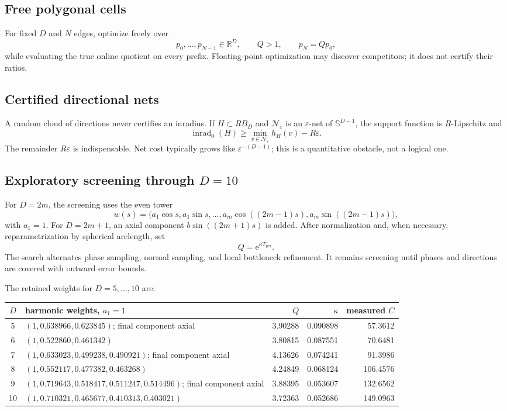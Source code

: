 \documentclass[10pt,a4paper]{article}
\newcommand{\R}{\mathbb{R}}
\newcommand{\Sph}{\mathbb{S}}
\newcommand{\inrad}{\operatorname{inrad}_{0}}
\newcommand{\e}{\mathrm{e}}
\newcommand{\BD}{B_D}
\theoremstyle{plain}
\theoremstyle{definition}
\theoremstyle{remark}
\begin{document}
\subsection{Free polygonal cells}

For fixed $D$ and $N$ edges, optimize freely over
\[
  p_0,\ldots,p_{N-1}\in\R^D,
  \qquad Q>1,
  \qquad p_N=Qp_0,
\]
while evaluating the true online quotient on every prefix. Floating-point optimization may discover competitors; it does not certify their ratios.

\subsection{Certified directional nets}

A random cloud of directions never certifies an inradius. If $H\subset R\BD$ and $\mathcal N_\varepsilon$ is an $\varepsilon$-net of $\Sph^{D-1}$, the support function is $R$-Lipschitz and
\[
  \inrad(H)\ge\min_{v\in\mathcal N_\varepsilon}h_H(v)-R\varepsilon.
\]
The remainder $R\varepsilon$ is indispensable. Net cost typically grows like $\varepsilon^{-(D-1)}$; this is a quantitative obstacle, not a logical one.

\subsection{Exploratory screening through $D=10$}

For $D=2m$, the screening uses the even tower
\[
  w(s)=\bigl(a_1\cos s,a_1\sin s,\ldots,
  a_m\cos((2m-1)s),a_m\sin((2m-1)s)\bigr),
\]
with $a_1=1$. For $D=2m+1$, an axial component $b\sin((2m+1)s)$ is added. After normalization and, when necessary, reparametrization by spherical arclength, set
\[
  Q=\e^{\kappa T_{\mathrm{per}}}.
\]
The search alternates phase sampling, normal sampling, and local bottleneck refinement. It remains screening until phases and directions are covered with outward error bounds.

The retained weights for $D=5,\ldots,10$ are:

\begin{center}
\scriptsize
\begin{tabularx}{\linewidth}{@{}c X r r r@{}}
\toprule
$D$ & harmonic weights, $a_1=1$ & $Q$ & $\kappa$ & measured $C$\\
\midrule
5 & $(1,0.638966,0.623845)$; final component axial & 3.90288 & 0.090898 & 57.3612\\
6 & $(1,0.522860,0.461342)$ & 3.80815 & 0.087551 & 70.6481\\
7 & $(1,0.633023,0.499238,0.490921)$; final component axial & 4.13626 & 0.074241 & 91.3986\\
8 & $(1,0.552117,0.477382,0.463268)$ & 4.24849 & 0.068124 & 106.4576\\
9 & $(1,0.719643,0.518417,0.511247,0.514496)$; final component axial & 3.88395 & 0.053607 & 132.6562\\
10 & $(1,0.710321,0.465677,0.410313,0.403021)$ & 3.72363 & 0.052686 & 149.0963\\
\bottomrule
\end{tabularx}
\end{center}
\end{document}
